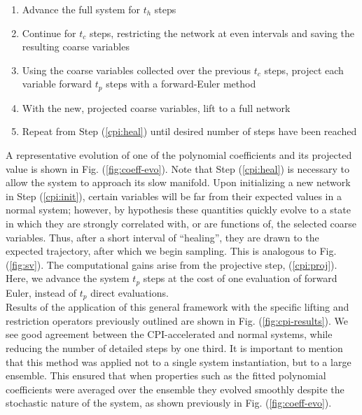 \documentclass[epjST, final]{svjour}
\begin{document}
\begin{onehalfspace}
\begin{enumerate}
\item Advance the full system for $t_h$ steps
\label{cpi:heal}
\item Continue for $t_c$ steps, restricting the network at even intervals and saving the resulting coarse variables
\item Using the coarse variables collected over the previous $t_c$ steps, project each variable forward $t_p$ steps with a forward-Euler method
\label{cpi:proj}
\item With the new, projected coarse variables, lift to a full network
\label{cpi:init}
\item Repeat from Step (\ref{cpi:heal}) until desired number of steps have been reached
\end{enumerate}

A representative evolution of one of the polynomial coefficients and its projected value is shown in Fig. (\ref{fig:coeff-evo}). Note that Step (\ref{cpi:heal}) is necessary to allow the system to approach its slow manifold. Upon initializing a new network in Step (\ref{cpi:init}), certain variables will be far from their expected values in a normal system; however, by hypothesis these quantities quickly evolve to a state in which they are strongly correlated with, or are functions of, the selected coarse variables. Thus, after a short interval of ``healing'', they are drawn to the expected trajectory, after which we begin sampling. This is analogous to Fig. (\ref{fig:sv}). The computational gains arise from the projective step, (\ref{cpi:proj}). Here, we advance the system $t_p$ steps at the cost of one evaluation of forward Euler, instead of $t_p$ direct evaluations. \\

Results of the application of this general framework with the specific lifting and restriction operators previously outlined are shown in Fig. (\ref{fig:cpi-results}). We see good agreement between the CPI-accelerated and normal systems, while reducing the number of detailed steps by one third. It is important to mention that this method was applied not to a single system instantiation, but to a large ensemble. This ensured that when properties such as the fitted polynomial coefficients were averaged over the ensemble they evolved smoothly despite the stochastic nature of the system, as shown previously in Fig. (\ref{fig:coeff-evo}).


\end{onehalfspace}
\end{document}
